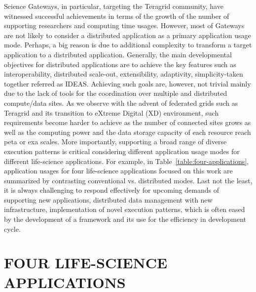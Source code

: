 \documentclass{sig-alternate}
\begin{document}
Science Gateways, in particular, targeting the Teragrid community, have witnessed successful achievements in terms of the growth of the number of supporting researchers and computing time usages.  However, most of Gateways are not likely to consider a distributed application as a primary application usage mode.  Perhaps, a big reason is due to additional complexity to transform a target application to a distributed application.  Generally, the main developmental objectives for distributed applications are to achieve the key features such as interoperability, distributed scale-out, extensibility, adaptivity, simplicity-taken together referred as IDEAS.  Achieving such goals are, however, not trivial mainly due to the lack of tools for the coordination over multiple and distributed compute/data sites.  As we observe with the advent of federated grids such as Teragrid and its transition to eXtreme Digital (XD) environment, such requirements become harder to achieve as the number of connected sites grows as well as the computing power and the data storage capacity of each resource reach peta or exa scales.   More importantly, supporting a broad range of diverse execution patterns is critical considering different application usage modes for different life-science applications.  For example, in Table~\ref{table:four-applications}, application usages for four life-science applications focused on this work are summarized by contrasting conventional vs. distributed modes.  Last not the least, it is always challenging to respond effectively for upcoming demands of supporting new applications, distributed data management with new infrastructure, implementation of novel execution patterns, which is often eased by the development of a framework and its use for the efficiency in development cycle.   



\section{FOUR LIFE-SCIENCE APPLICATIONS}
\end{document}
